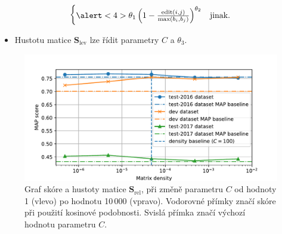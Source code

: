 \documentclass[aspectratio=169,t]{beamer}
\let\abbr\relax
\begin{document}
\begin{frame}
\begin{itemize}
\begin{equation*}
\begin{cases}
        \alert<4>{\theta_1\left(1-\frac{\operatorname{edit}(i, j)}{\max(b_i, b_j)}\right)^{\theta_2}} & \index{.h1@$\theta_1$|emph}\index{.h2@$\theta_2$|emph}\index{.h3@$\theta _3$|emph}\text{jinak.}
      \end{cases}
    \end{equation*}
    \begin{itemize}
      \item<5-> \alert<3>{Hustotu} matice $\mathbf{S}_{\text{lev}}$ \alert<5>{lze
        řídit parametry $C$ a $\theta_3$}.
    \end{itemize}
\end{itemize}
\end{frame}

\begin{frame}[c]
\begin{figure}
\vfill
\begin{center}
\includegraphics[scale=0.65]{figs/fig2}
\end{center}
  \caption{Graf \abbr{MAP} skóre a hustoty matice $\mathbf S_{\text{rel}}$, \alert{při
  změně parametru $C$} od hodnoty 1 (vlevo) po hodnotu 10\,000 (vpravo).
  Vodorovné přímky značí \abbr{MAP} skóre při použití kosinové podobnosti.
  Svislá přímka značí výchozí hodnotu parametru $C$.}
\end{figure}
\end{frame}

\end{document}
